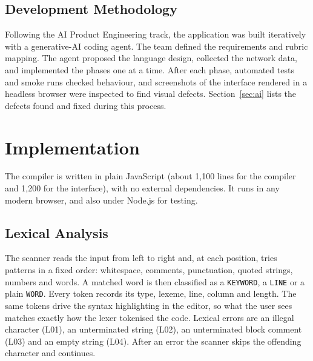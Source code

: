 \documentclass[conference]{IEEEtran}
\begin{document}
\subsection{Development Methodology}
Following the AI Product Engineering track, the application was built iteratively with a generative-AI coding agent. The team defined the requirements and rubric mapping. The agent proposed the language design, collected the network data, and implemented the phases one at a time. After each phase, automated tests and smoke runs checked behaviour, and screenshots of the interface rendered in a headless browser were inspected to find visual defects. Section~\ref{sec:ai} lists the defects found and fixed during this process.

\section{Implementation}\label{sec:impl}
The compiler is written in plain JavaScript (about 1{,}100 lines for the compiler and 1{,}200 for the interface), with no external dependencies. It runs in any modern browser, and also under Node.js for testing.

\subsection{Lexical Analysis}
The scanner reads the input from left to right and, at each position, tries patterns in a fixed order: whitespace, comments, punctuation, quoted strings, numbers and words. A matched word is then classified as a \texttt{KEYWORD}, a \texttt{LINE} or a plain \texttt{WORD}. Every token records its type, lexeme, line, column and length. The same tokens drive the syntax highlighting in the editor, so what the user sees matches exactly how the lexer tokenised the code. Lexical errors are an illegal character (L01), an unterminated string (L02), an unterminated block comment (L03) and an empty string (L04). After an error the scanner skips the offending character and continues.
\end{document}

